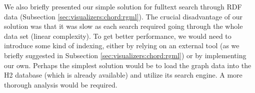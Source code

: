 We also briefly presented our simple solution for fulltext search through RDF data (Subsection \ref{sec:visualizers:chord:rgml}). The crucial disadvantage of our solution was that it was slow as each search required going through the whole data set (linear complexity). To get better performance, we would need to introduce some kind of indexing, either by relying on an external tool (as we briefly suggested in Subsection \ref{sec:visualizers:chord:rgml}) or by implementing our own. Perhaps the simplest solution would be to load the graph data into the H2 database (which is already available) and utilize its search engine. A more thorough analysis would be required.